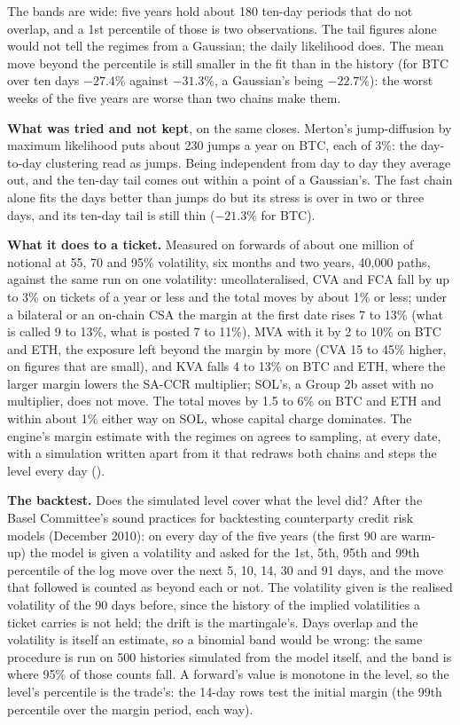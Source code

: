 \documentclass[11pt,a4paper]{article}
\newcommand{\code}[1]{\ifmmode\text{\small\texttt{\detokenize{#1}}}\else{\small\path{#1}}\fi}
\begin{document}
The bands are wide: five years hold about 180 ten-day periods that do not overlap, and a 1st percentile of those is two observations. The tail figures alone would not tell the regimes from a Gaussian; the daily likelihood does. The mean move beyond the percentile is still smaller in the fit than in the history (for BTC over ten days $-27.4\%$ against $-31.3\%$, a Gaussian's being $-22.7\%$): the worst weeks of the five years are worse than two chains make them.

\textbf{What was tried and not kept}, on the same closes. Merton's jump-diffusion by maximum likelihood puts about 230 jumps a year on BTC, each of 3\%: the day-to-day clustering read as jumps. Being independent from day to day they average out, and the ten-day tail comes out within a point of a Gaussian's. The fast chain alone fits the days better than jumps do but its stress is over in two or three days, and its ten-day tail is still thin ($-21.3\%$ for BTC).

\textbf{What it does to a ticket.} Measured on forwards of about one million of notional at 55, 70 and 95\% volatility, six months and two years, 40,000 paths, against the same run on one volatility: uncollateralised, CVA and FCA fall by up to 3\% on tickets of a year or less and the total moves by about 1\% or less; under a bilateral or an on-chain CSA the margin at the first date rises 7 to 13\% (what is called 9 to 13\%, what is posted 7 to 11\%), MVA with it by 2 to 10\% on BTC and ETH, the exposure left beyond the margin by more (CVA 15 to 45\% higher, on figures that are small), and KVA falls 4 to 13\% on BTC and ETH, where the larger margin lowers the SA-CCR multiplier; SOL's, a Group 2b asset with no multiplier, does not move. The total moves by 1.5 to 6\% on BTC and ETH and within about 1\% either way on SOL, whose capital charge dominates. The engine's margin estimate with the regimes on agrees to sampling, at every date, with a simulation written apart from it that redraws both chains and steps the level every day (\code{tests/test_vol_regimes.py}).

\textbf{The backtest.} Does the simulated level cover what the level did? After the Basel Committee's sound practices for backtesting counterparty credit risk models (December 2010): on every day of the five years (the first 90 are warm-up) the model is given a volatility and asked for the 1st, 5th, 95th and 99th percentile of the log move over the next 5, 10, 14, 30 and 91 days, and the move that followed is counted as beyond each or not. The volatility given is the realised volatility of the 90 days before, since the history of the implied volatilities a ticket carries is not held; the drift is the martingale's. Days overlap and the volatility is itself an estimate, so a binomial band would be wrong: the same procedure is run on 500 histories simulated from the model itself, and the band is where 95\% of those counts fall. A forward's value is monotone in the level, so the level's percentile is the trade's: the 14-day rows test the initial margin (the 99th percentile over the margin period, each way).
\end{document}
